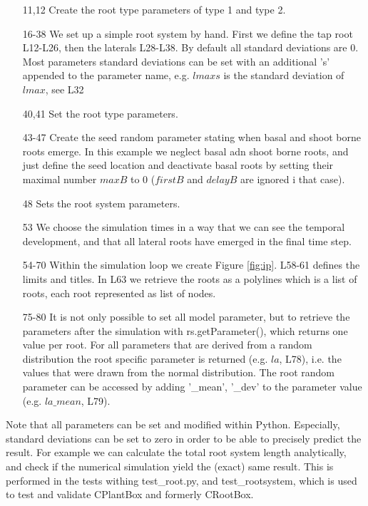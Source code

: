 \begin{itemize}

\item[11,12] Create the root type parameters of type 1 and type 2.
\item[16-38] We set up a simple root system by hand. First we define the tap root L12-L26, then the laterals L28-L38. By default all standard deviations are 0. Most parameters standard deviations can be set with an additional 's' appended to the parameter name, e.g. $lmaxs$ is the standard deviation of $lmax$, see L32
\item[40,41] Set the root type parameters.

\item[43-47] Create the seed random parameter stating when basal and shoot borne roots emerge. In this example we neglect basal adn shoot borne roots, and just define the seed location and deactivate basal roots by setting their maximal number $maxB$ to 0 ($firstB$ and $delayB$ are ignored i that case). 
\item[48] Sets the root system parameters.

\item[53] We choose the simulation times in a way that we can see the temporal development, and that all lateral roots have emerged in the final time step.

\item[54-70] Within the simulation loop we create Figure \ref{fig:ip}. L58-61 defines the limits and titles. In L63 we retrieve the roots as a polylines which is a list of roots, each root represented as list of nodes.

\item[75-80] It is not only possible to set all model parameter, 
but to retrieve the parameters after the simulation with rs.getParameter(), which returns one value per root. For all parameters that are derived from a random distribution the root specific parameter is returned (e.g. $la$, L78), i.e. the values that were drawn from the normal distribution. The root random parameter can be accessed by adding '\_mean', '\_dev' to the parameter value (e.g. $la\_mean$, L79).

\end{itemize}

Note that all parameters can be set and modified within Python. Especially, standard deviations can be set to zero in order to be able to precisely predict the result. For example we can calculate the total root system length analytically, and check if the numerical simulation yield the (exact) same result. This is performed in the tests withing test\_root.py, and test\_rootsystem, which is used to test and validate CPlantBox and formerly CRootBox.

